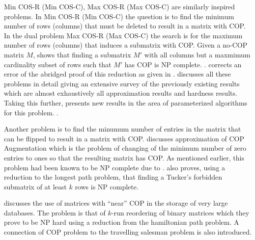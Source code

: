 \documentclass[MS,]{iitmdiss}
\begin{document}
{\sc Min COS-R (Min COS-C), Max COS-R (Max COS-C)} are similarly
inspired problems. In {\sc Min COS-R (Min COS-C)} the question is to
find the minimum number of rows (columns) that must be deleted to
result in a matrix with COP.  In the dual problem {\sc Max COS-R (Max
  COS-C)} the search is for the maximum number of rows (columns) that
induces a submatrix with COP. Given a no-COP matrix $M$,
\cite{b75-phd} shows that finding a submatrix $M'$ with all columns
but a maxmimum cardinality subset of rows such that $M'$ has COP is NP
complete. . \cite{hg02} corrects an error of the abridged proof
of this reduction as given in \cite{gj79}.  \cite{d08phd} discusses
all these problems in detail giving an extensive survey of the
previously existing results which are almost exhaustively all
approximation results and hardness results. Taking this further,
\cite{d08phd} presents new results in the area of parameterized
algorithms for this problem. .


Another problem is to find the minumum number of entries in the matrix
that can be flipped to result in a matrix with COP.  \cite{v85}
discusses approximation of {\sc COP Augmentation} which is the problem
of changing of the minimum number of zero entries to ones so that the
resulting matrix has COP. As mentioned earlier, this problem had been known
to be NP complete due to \cite{b75-phd}. \cite{v85} also proves, using
a reduction to the longest path problem,  that finding a Tucker's forbidden
submatrix of at least $k$
rows is NP complete.  \\




\cite{jkckv04}  discusses the use of matrices
with ``near'' COP in the storage of very large databases.
The problem is that of $k$-run reordering of binary matrices which
they prove to be NP hard using a reduction from the hamiltonian path problem.
A connection of COP problem to the travelling salesman problem is also
introduced. 
\end{document}
